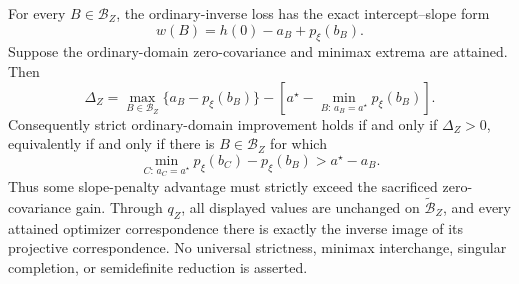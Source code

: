 For every \(B\in\mathcal B_Z\), the ordinary-inverse loss has the exact intercept--slope form
\[
w(B)=h(0)-a_B+p_\xi(b_B).
\]
Suppose the ordinary-domain zero-covariance and minimax extrema are attained.  Then
\[
\Delta_Z=
\max_{B\in\mathcal B_Z}\{a_B-p_\xi(b_B)\}
-\left[a^\star-\min_{B:\,a_B=a^\star}p_\xi(b_B)\right].
\]
Consequently strict ordinary-domain improvement holds if and only if \(\Delta_Z>0\), equivalently if and only if there is \(B\in\mathcal B_Z\) for which
\[
\min_{C:\,a_C=a^\star}p_\xi(b_C)-p_\xi(b_B)
>a^\star-a_B.
\]
Thus some slope-penalty advantage must strictly exceed the sacrificed zero-covariance gain.  Through \(q_Z\), all displayed values are unchanged on \(\widetilde{\mathcal B}_Z\), and every attained optimizer correspondence there is exactly the inverse image of its projective correspondence.  No universal strictness, minimax interchange, singular completion, or semidefinite reduction is asserted.